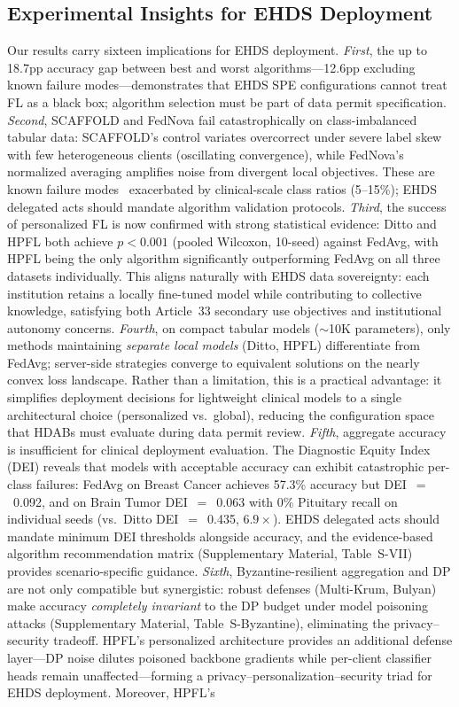 \documentclass[conference,a4paper]{IEEEtran}
\begin{document}
\subsection{Experimental Insights for EHDS Deployment}

Our results carry sixteen implications for EHDS deployment. \textit{First}, the up to 18.7pp accuracy gap between best and worst algorithms---12.6pp excluding known failure modes---demonstrates that EHDS SPE configurations cannot treat FL as a black box; algorithm selection must be part of data permit specification. \textit{Second}, SCAFFOLD and FedNova fail catastrophically on class-imbalanced tabular data: SCAFFOLD's control variates overcorrect under severe label skew with few heterogeneous clients (oscillating convergence), while FedNova's normalized averaging amplifies noise from divergent local objectives. These are known failure modes~\cite{karimireddy2020scaffold, wang2020tackling} exacerbated by clinical-scale class ratios (5--15\%); EHDS delegated acts should mandate algorithm validation protocols. \textit{Third}, the success of personalized FL is now confirmed with strong statistical evidence: Ditto and HPFL both achieve $p < 0.001$ (pooled Wilcoxon, 10-seed) against FedAvg, with HPFL being the only algorithm significantly outperforming FedAvg on all three datasets individually. This aligns naturally with EHDS data sovereignty: each institution retains a locally fine-tuned model while contributing to collective knowledge, satisfying both Article~33 secondary use objectives and institutional autonomy concerns. \textit{Fourth}, on compact tabular models ($\sim$10K parameters), only methods maintaining \textit{separate local models} (Ditto, HPFL) differentiate from FedAvg; server-side strategies converge to equivalent solutions on the nearly convex loss landscape. Rather than a limitation, this is a practical advantage: it simplifies deployment decisions for lightweight clinical models to a single architectural choice (personalized vs.\ global), reducing the configuration space that HDABs must evaluate during data permit review. \textit{Fifth}, aggregate accuracy is insufficient for clinical deployment evaluation. The Diagnostic Equity Index (DEI) reveals that models with acceptable accuracy can exhibit catastrophic per-class failures: FedAvg on Breast Cancer achieves 57.3\% accuracy but DEI~$=$~0.092, and on Brain Tumor DEI~$=$~0.063 with 0\% Pituitary recall on individual seeds (vs.\ Ditto DEI~$=$~0.435, $6.9\times$). EHDS delegated acts should mandate minimum DEI thresholds alongside accuracy, and the evidence-based algorithm recommendation matrix (Supplementary Material, Table~S-VII) provides scenario-specific guidance. \textit{Sixth}, Byzantine-resilient aggregation and DP are not only compatible but synergistic: robust defenses (Multi-Krum, Bulyan) make accuracy \textit{completely invariant} to the DP budget under model poisoning attacks (Supplementary Material, Table~S-Byzantine), eliminating the privacy--security tradeoff. HPFL's personalized architecture provides an additional defense layer---DP noise dilutes poisoned backbone gradients while per-client classifier heads remain unaffected---forming a privacy--personalization--security triad for EHDS deployment. Moreover, HPFL's 
\end{document}
